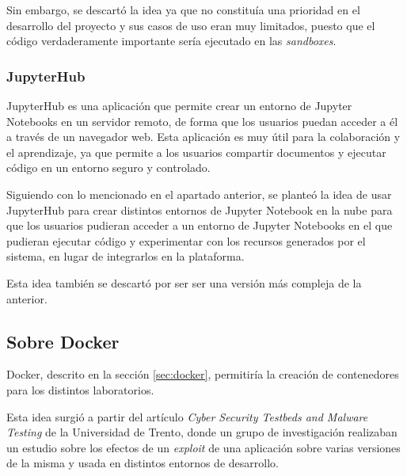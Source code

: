                 Sin embargo, se descartó la idea ya que no constituía una prioridad en el desarrollo del proyecto y sus casos de uso eran muy limitados, puesto que el código verdaderamente importante sería ejecutado en las \textit{sandboxes}.
                

            \subsubsection{JupyterHub}

                JupyterHub \cite{jupyterhub} es una aplicación que permite crear un entorno de Jupyter Notebooks en un servidor remoto, de forma que los usuarios puedan acceder a él a través de un navegador web. Esta aplicación es muy útil para la colaboración y el aprendizaje, ya que permite a los usuarios compartir documentos y ejecutar código en un entorno seguro y controlado.
                
                Siguiendo con lo mencionado en el apartado anterior, se planteó la idea de usar JupyterHub para crear distintos entornos de Jupyter Notebook en la nube para que los usuarios pudieran acceder a un entorno de Jupyter Notebooks en el que pudieran ejecutar código y experimentar con los recursos generados por el sistema, en lugar de integrarlos en la plataforma.

                Esta idea también se descartó por ser ser una versión más compleja de la anterior.
                
                \newpage

                
        \subsection{Sobre Docker}

            Docker, descrito en la sección \ref{sec:docker}, permitiría la creación de contenedores para los distintos laboratorios.
                
            Esta idea surgió a partir del artículo \textit{Cyber Security Testbeds and Malware Testing} \cite{securitylab-malware-analysis} de la Universidad de Trento, donde un grupo de investigación realizaban un estudio sobre los efectos de un \textit{exploit} de una aplicación sobre varias versiones de la misma y usada en distintos entornos de desarrollo.


